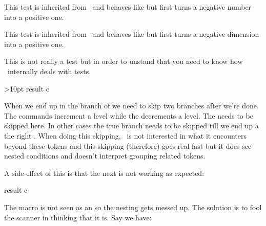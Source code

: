 \stopsectionlevel

\startsectionlevel[title={\tex{ifabsnum}}]

This test is inherited from \PDFTEX\ and behaves like \type {\ifnum} but first
turns a negative number into a positive one.

\stopsectionlevel

\startsectionlevel[title={\tex{ifabsdim}}]

This test is inherited from \PDFTEX\ and behaves like \type {\ifdim} but first
turns a negative dimension into a positive one.

\stopsectionlevel

\startsectionlevel[title={\tex{ifcondition}}]

This is not really a test but in order to unstand that you need to know how
\TEX\ internally deals with tests.

\starttyping[option=TEX]
\ifdimen\scratchdimen>10pt
    \ifdim\scratchdimen<20pt
        result a
    \else
        result b
    \fi
\else
    result c
\fi
\stoptyping

When we end up in the branch of  we need to skip two \type
{\else} branches after we're done. The  commands increment a level
while the \type {\fi} decrements a level. The \type {\else} needs to be skipped
here. In other cases the true branch needs to be skipped till we end up a the
right \type {\else}. When doing this skipping, \TEX\ is not interested in what it
encounters beyond these tokens and this skipping (therefore) goes real fast but
it does see nested conditions and doesn't interpret grouping related tokens.

A side effect of this is that the next is not working as expected:

\starttyping[option=TEX]
\def\ifmorethan{\ifdim\scratchdimen>}
\def\iflessthan{\ifdim\scratchdimen<}

    \iflessthan20pt
        result a
    \else
        result b
    \fi
\else
    result c
\fi
\stoptyping

The \type{\iflessthan} macro is not seen as an  so the nesting gets
messed up. The solution is to fool the scanner in thinking that it is. Say we have:

\startbuffer
\scratchdimen=25pt

\def\ifmorethan{\ifdim\scratchdimen>}
\def\iflessthan{\ifdim\scratchdimen<}
\stopbuffer

\typebuffer[option=TEX] \getbuffer

